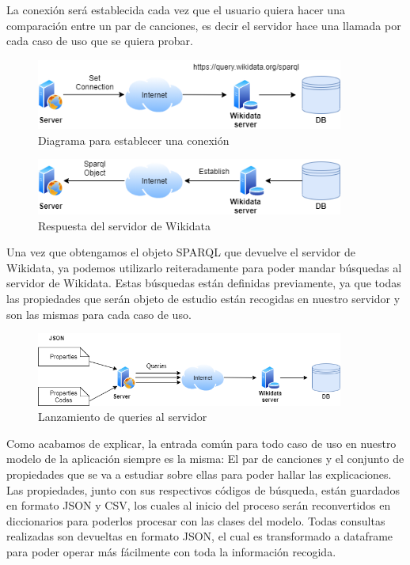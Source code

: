 La conexión será establecida cada vez que el usuario quiera hacer una comparación entre un par de canciones, es decir el servidor hace una llamada por cada caso de uso que se quiera probar.\\

\begin{figure}[h!]
	\centering
	\includegraphics[width = 0.9\textwidth]{Imagenes/Bitmap/setConnection.png}
	\caption{Diagrama para establecer una conexión}
	\label{fig:diagramaConexion}
\end{figure}

\begin{figure}[h!]
	\centering
	\includegraphics[width = 0.9\textwidth]{Imagenes/Bitmap/conexionReturn.png}
	\caption{Respuesta del servidor de Wikidata}
	\label{fig:respuestaWikidata}
\end{figure}

Una vez que obtengamos el objeto SPARQL que devuelve el servidor de Wikidata, ya podemos utilizarlo reiteradamente para poder mandar búsquedas al servidor de Wikidata. Estas búsquedas están definidas previamente, ya que todas las propiedades que serán objeto de estudio están recogidas en nuestro servidor y son las mismas para cada caso de uso. 
\\

\begin{figure}[h!]
	\centering
	\includegraphics[width = 0.9\textwidth]{Imagenes/Bitmap/conexion.png}
	\caption{Lanzamiento de queries al servidor}
	\label{fig:queriesServidor}
\end{figure}

Como acabamos de explicar, la entrada común para todo caso de uso en nuestro modelo de la aplicación siempre es la misma: El par de canciones y el conjunto de propiedades que se va a estudiar sobre ellas para poder hallar las explicaciones. Las propiedades, junto con sus respectivos códigos de búsqueda, están guardados en formato JSON y CSV, los cuales al inicio del proceso serán reconvertidos en diccionarios para poderlos procesar con las clases del modelo. Todas consultas realizadas son devueltas en formato JSON, el cual es transformado a dataframe para poder operar más fácilmente con toda la información recogida.\\

